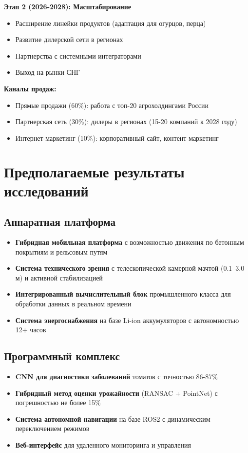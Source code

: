 \documentclass[12pt,a4paper]{article}
\begin{document}
\textbf{Этап 2 (2026-2028): Масштабирование}
\begin{itemize}
    \item Расширение линейки продуктов (адаптация для огурцов, перца)
    \item Развитие дилерской сети в регионах
    \item Партнерства с системными интеграторами
    \item Выход на рынки СНГ
\end{itemize}

\textbf{Каналы продаж:}
\begin{itemize}
    \item Прямые продажи (60\%): работа с топ-20 агрохолдингами России
    \item Партнерская сеть (30\%): дилеры в регионах (15-20 компаний к 2028 году)
    \item Интернет-маркетинг (10\%): корпоративный сайт, контент-маркетинг
\end{itemize}

\section{Предполагаемые результаты исследований}

\subsection{Аппаратная платформа}
\begin{itemize}
    \item \textbf{Гибридная мобильная платформа} с возможностью движения по бетонным покрытиям и рельсовым путям
    \item \textbf{Система технического зрения} с телескопической камерной мачтой (0.1–3.0 м) и активной стабилизацией
    \item \textbf{Интегрированный вычислительный блок} промышленного класса для обработки данных в реальном времени
    \item \textbf{Система энергоснабжения} на базе Li-ion аккумуляторов с автономностью 12+ часов
\end{itemize}

\subsection{Программный комплекс}
\begin{itemize}
    \item \textbf{CNN для диагностики заболеваний} томатов с точностью 86-87\%
    \item \textbf{Гибридный метод оценки урожайности} (RANSAC + PointNet) с погрешностью не более 15\%
    \item \textbf{Система автономной навигации} на базе ROS2 с динамическим переключением режимов
    \item \textbf{Веб-интерфейс} для удаленного мониторинга и управления
\end{itemize}
\end{document}
